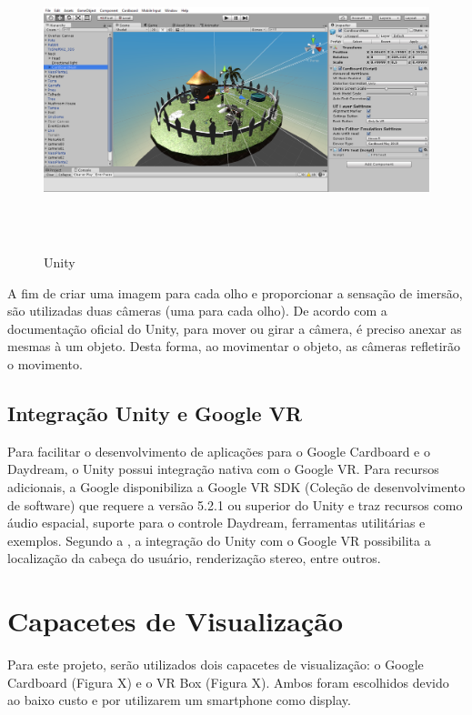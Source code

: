 \begin{figure}[h]
	\caption{\small Unity}
	\centering
	\includegraphics[height= 8cm]{Imagens/unity.png}
	\label{f.unity}
\end{figure}

A fim de criar uma imagem para cada olho e proporcionar a sensação de imersão, são utilizadas duas câmeras (uma para cada olho). De acordo com a documentação oficial do Unity, para mover ou girar a câmera, é preciso anexar as mesmas à um objeto. Desta forma, ao movimentar o objeto, as câmeras refletirão o movimento. 

\subsection{Integração Unity e Google VR}
\label{ss.unitygoogle}

Para facilitar o desenvolvimento de aplicações para o Google Cardboard e o Daydream, o Unity possui integração nativa com o Google VR. Para recursos adicionais, a Google disponibiliza a Google VR SDK (Coleção de desenvolvimento de software) que requere a versão 5.2.1 ou superior do Unity e traz recursos como áudio espacial, suporte para o controle Daydream, ferramentas utilitárias e exemplos.  Segundo a , a integração do Unity com o Google VR possibilita a localização da cabeça do usuário, renderização stereo, entre outros. 

\section{Capacetes de Visualização}
\label{s.capacetes}

Para este projeto, serão utilizados dois capacetes de visualização: o Google Cardboard (Figura X) e o VR Box (Figura X). Ambos foram escolhidos devido ao baixo custo e por utilizarem um smartphone como display. 


